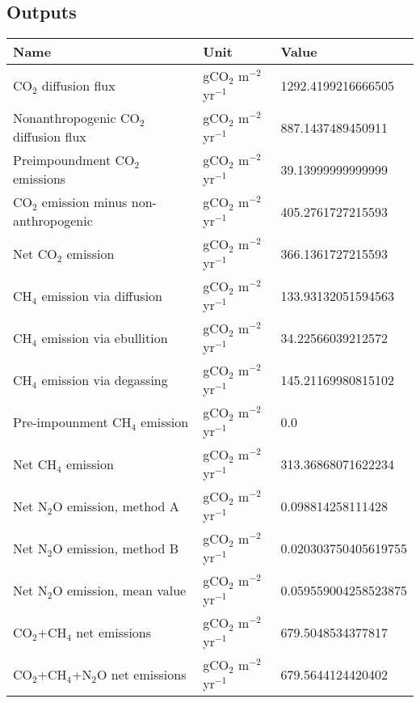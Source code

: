 \documentclass{article}%
\begin{document}
%
\subsection{Outputs}%
\label{subsec:Outputs}%
\begin{center}%
\renewcommand{\arraystretch}{1.0}%
\begin{tabu}{@{}p{10cm} X[c] X[l]@{}}%
\toprule%
\textbf{Name}&\textbf{Unit}&\textbf{Value}\\%
\midrule%
CO$_2$ diffusion flux&gCO$_2$ m$^{-2}$ yr$^{-1}$&\num[round-precision=4,round-mode=figures]{1292.4199216666505}\\%
Nonanthropogenic CO$_2$ diffusion flux&gCO$_2$ m$^{-2}$ yr$^{-1}$&\num[round-precision=4,round-mode=figures]{887.1437489450911}\\%
Preimpoundment CO$_2$ emissions&gCO$_2$ m$^{-2}$ yr$^{-1}$&\num[round-precision=4,round-mode=figures]{39.13999999999999}\\%
CO$_2$ emission minus non-anthropogenic&gCO$_2$ m$^{-2}$ yr$^{-1}$&\num[round-precision=4,round-mode=figures]{405.2761727215593}\\%
Net CO$_2$ emission&gCO$_2$ m$^{-2}$ yr$^{-1}$&\num[round-precision=4,round-mode=figures]{366.1361727215593}\\%
CH$_4$ emission via diffusion&gCO$_2$ m$^{-2}$ yr$^{-1}$&\num[round-precision=4,round-mode=figures]{133.93132051594563}\\%
CH$_4$ emission via ebullition&gCO$_2$ m$^{-2}$ yr$^{-1}$&\num[round-precision=4,round-mode=figures]{34.22566039212572}\\%
CH$_4$ emission via degassing&gCO$_2$ m$^{-2}$ yr$^{-1}$&\num[round-precision=4,round-mode=figures]{145.21169980815102}\\%
Pre-impounment CH$_4$ emission&gCO$_2$ m$^{-2}$ yr$^{-1}$&\num[round-precision=4,round-mode=figures]{0.0}\\%
Net CH$_4$ emission&gCO$_2$ m$^{-2}$ yr$^{-1}$&\num[round-precision=4,round-mode=figures]{313.36868071622234}\\%
Net N$_2$O emission, method A&gCO$_2$ m$^{-2}$ yr$^{-1}$&\num[round-precision=4,round-mode=figures]{0.098814258111428}\\%
Net N$_2$O emission, method B&gCO$_2$ m$^{-2}$ yr$^{-1}$&\num[round-precision=4,round-mode=figures]{0.020303750405619755}\\%
Net N$_2$O emission, mean value&gCO$_2$ m$^{-2}$ yr$^{-1}$&\num[round-precision=4,round-mode=figures]{0.059559004258523875}\\%
\midrule%
CO$_2$+CH$_4$ net emissions&gCO$_2$ m$^{-2}$ yr$^{-1}$&\num[round-precision=4,round-mode=figures]{679.5048534377817}\\%
\midrule%
CO$_2$+CH$_4$+N$_2$O net emissions&gCO$_2$ m$^{-2}$ yr$^{-1}$&\num[round-precision=4,round-mode=figures]{679.5644124420402}\\\bottomrule%
%
\end{tabu}%
\end{center}%
\end{document}
